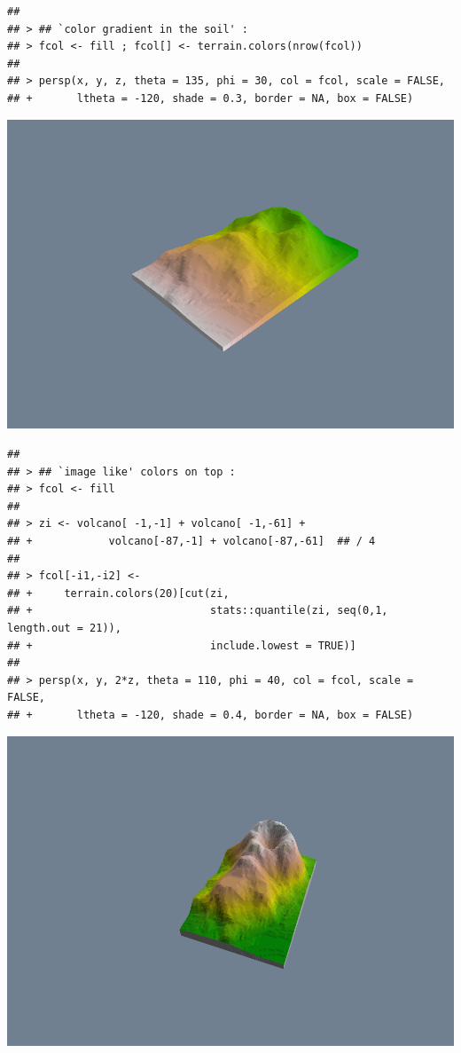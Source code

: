 \documentclass[]{book}
\begin{document}
\begin{verbatim}
## 
## > ## `color gradient in the soil' :
## > fcol <- fill ; fcol[] <- terrain.colors(nrow(fcol))
## 
## > persp(x, y, z, theta = 135, phi = 30, col = fcol, scale = FALSE,
## +       ltheta = -120, shade = 0.3, border = NA, box = FALSE)
\end{verbatim}

\includegraphics{TudodoR_files/figure-latex/unnamed-chunk-146-7.pdf}

\begin{verbatim}
## 
## > ## `image like' colors on top :
## > fcol <- fill
## 
## > zi <- volcano[ -1,-1] + volcano[ -1,-61] +
## +            volcano[-87,-1] + volcano[-87,-61]  ## / 4
## 
## > fcol[-i1,-i2] <-
## +     terrain.colors(20)[cut(zi,
## +                            stats::quantile(zi, seq(0,1, length.out = 21)),
## +                            include.lowest = TRUE)]
## 
## > persp(x, y, 2*z, theta = 110, phi = 40, col = fcol, scale = FALSE,
## +       ltheta = -120, shade = 0.4, border = NA, box = FALSE)
\end{verbatim}

\includegraphics{TudodoR_files/figure-latex/unnamed-chunk-146-8.pdf}
\end{document}

